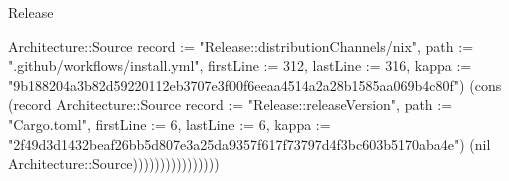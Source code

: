 \begin{lexlean}{Release}
\begin{semanticmodule}
{Architecture::Source {record := "Release::distributionChannels/nix", path := ".github/workflows/install.yml", firstLine := 312, lastLine := 316, kappa := "9b188204a3b82d59220112eb3707e3f00f6eeaa4514a2a28b1585aa069b4c80f"}) (cons (record Architecture::Source {record := "Release::releaseVersion", path := "Cargo.toml", firstLine := 6, lastLine := 6, kappa := "2f49d3d1432beaf26bb5d807e3a25da9357f617f73797d4f3bc603b5170aba4e"}) (nil Architecture::Source))))))))))))))))
}
\end{semanticmodule}
\end{lexlean}
